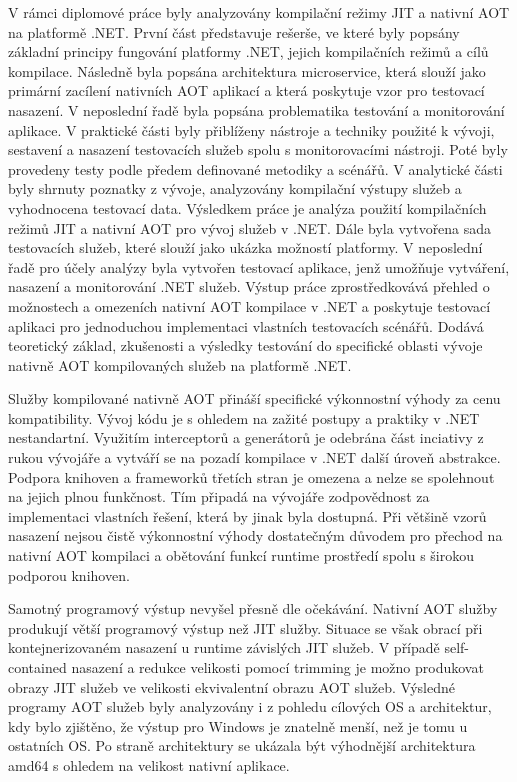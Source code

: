 
V rámci diplomové práce byly analyzovány kompilační režimy JIT a nativní AOT na platformě .NET. První část představuje rešerše, ve které byly popsány základní principy fungování platformy .NET, jejich kompilačních režimů a cílů kompilace. Následně byla popsána architektura microservice, která slouží jako primární zacílení nativních AOT aplikací a která poskytuje vzor pro testovací nasazení. V neposlední řadě byla popsána problematika testování a monitorování aplikace. V praktické části byly přiblíženy nástroje a techniky použité k vývoji, sestavení a nasazení testovacích služeb spolu s monitorovacími nástroji. Poté byly provedeny testy podle předem definované metodiky a scénářů. V analytické části byly shrnuty poznatky z vývoje, analyzovány kompilační výstupy služeb a vyhodnocena testovací data. Výsledkem práce je analýza použití kompilačních režimů JIT a nativní AOT pro vývoj služeb v .NET. Dále byla vytvořena sada testovacích služeb, které slouží jako ukázka možností platformy. V neposlední řadě pro účely analýzy byla vytvořen testovací aplikace, jenž umožňuje vytváření, nasazení a monitorování .NET služeb. Výstup práce zprostředkovává přehled o možnostech a omezeních nativní AOT kompilace v .NET a poskytuje testovací aplikaci pro jednoduchou implementaci vlastních testovacích scénářů. Dodává teoretický základ, zkušenosti a výsledky testování do specifické oblasti vývoje nativně AOT kompilovaných služeb na platformě .NET.

Služby kompilované nativně AOT přináší specifické výkonnostní výhody za cenu kompatibility. Vývoj kódu je s ohledem na zažité postupy a praktiky v .NET nestandartní. Využitím interceptorů a generátorů je odebrána část inciativy z rukou vývojáře a vytváří se na pozadí kompilace v .NET další úroveň abstrakce. Podpora knihoven a frameworků třetích stran je omezena a nelze se spolehnout na jejich plnou funkčnost. Tím připadá na vývojáře zodpovědnost za implementaci vlastních řešení, která by jinak byla dostupná. Při většině vzorů nasazení nejsou čistě výkonnostní výhody dostatečným důvodem pro přechod na nativní AOT kompilaci a obětování funkcí runtime prostředí spolu s širokou podporou knihoven.

Samotný programový výstup nevyšel přesně dle očekávání. Nativní AOT služby produkují větší programový výstup než JIT služby. Situace se však obrací při kontejnerizovaném nasazení u runtime závislých JIT služeb. V případě self-contained nasazení a redukce velikosti pomocí trimming je možno produkovat obrazy JIT služeb ve velikosti ekvivalentní obrazu AOT služeb. Výsledné programy AOT služeb byly analyzovány i z pohledu cílových OS a architektur, kdy bylo zjištěno, že výstup pro Windows je znatelně menší, než je tomu u ostatních OS. Po straně architektury se ukázala být výhodnější architektura amd64 s ohledem na velikost nativní aplikace.

